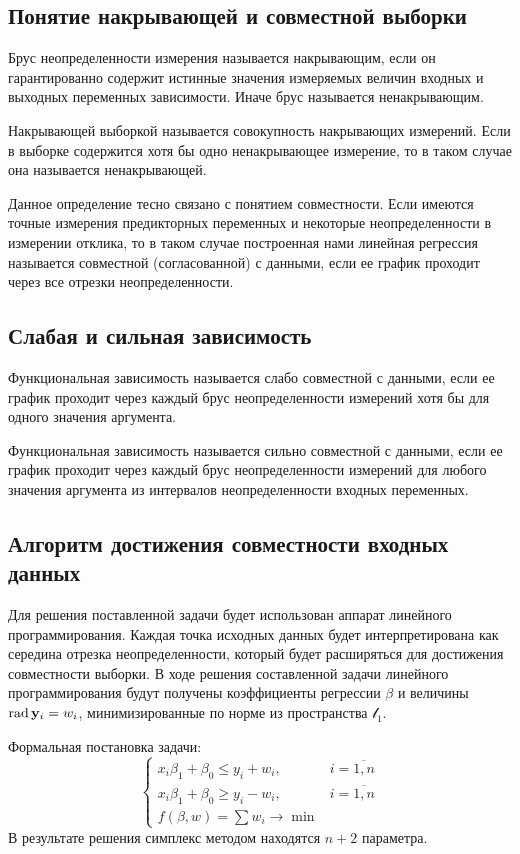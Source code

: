 \documentclass[a4paper]{article}
\begin{document}
\subsection{Понятие накрывающей и совместной выборки}
Брус неопределенности измерения называется накрывающим, если он гарантированно содержит истинные значения измеряемых величин входных и выходных переменных зависимости. Иначе брус называется ненакрывающим.

Накрывающей выборкой называется совокупность накрывающих измерений. Если в выборке содержится хотя бы одно ненакрывающее измерение, то в таком случае она называется ненакрывающей. 

Данное определение тесно связано с понятием совместности. Если имеются точные измерения предикторных переменных и некоторые неопределенности в измерении отклика, то в таком случае построенная нами линейная регрессия называется совместной (согласованной) с данными, если ее график проходит через все отрезки неопределенности. 
\subsection{Слабая и сильная зависимость}
Функциональная зависимость называется слабо совместной с данными, если ее график проходит через каждый брус неопределенности измерений хотя бы для одного значения аргумента. 

Функциональная зависимость называется сильно совместной с данными, если ее график проходит через каждый брус неопределенности измерений для любого значения аргумента из интервалов неопределенности входных переменных.
\subsection{Алгоритм достижения совместности входных данных}
Для решения поставленной задачи будет использован аппарат линейного программирования. Каждая точка исходных данных будет интерпретирована как середина отрезка неопределенности, который будет расширяться для достижения совместности выборки. В ходе решения составленной задачи линейного программирования будут получены коэффициенты регрессии $\beta$ и величины $\operatorname{rad}{\mathbf{y}_i}=w_i$, минимизированные по норме из пространства $\mathcal{l}_1$. 

Формальная постановка задачи:
\begin{equation}\label{alg1}
\begin{cases}
        x_i\beta_1+\beta_0\leq y_i + w_i,& i=\overline{1,n}\\
        x_i\beta_1+\beta_0\geq y_i - w_i,& i=\overline{1,n}\\
        f(\beta,w)=\sum w_i\rightarrow \min        
\end{cases}
\end{equation}
В результате решения симплекс методом находятся $n+2$ параметра.
\end{document}
